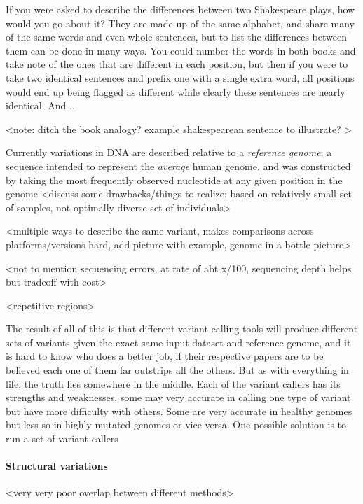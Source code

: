If you were asked to describe the differences between two Shakespeare plays, how would you go about it? They are made up of the same alphabet, and share many of the same words and even whole sentences, but to list the differences between them can be done in many ways. You could number the words in both books and take note of the ones that are different in each position, but then if you were to take two identical sentences and prefix one with a single extra word, all positions would end up being flagged as different while clearly these sentences are nearly identical. And ..

<note: ditch the book analogy? example shakespearean sentence to illustrate? >



Currently variations in DNA are described relative to a \emph{reference genome}; a sequence intended to represent the \emph{average} human genome, and was constructed by taking the most frequently observed nucleotide at any given  position in the genome
<discuss some drawbacks/things to realize: based on relatively small set of samples, not optimally diverse set of individuals>

<multiple ways to describe the same variant, makes comparisons across platforms/versions hard, add picture with example, genome in a bottle picture>

<not to mention sequencing errors, at rate of abt x/100, sequencing depth helps but tradeoff with cost>

<repetitive regions>

The result of all of this is that different variant calling tools will produce different sets of variants given the exact same input dataset and reference genome, and it is hard to know who does a better job, if their respective papers are to be believed each one of them far outstrips all the others. But as with everything in life, the truth lies somewhere in the middle. Each of the variant callers has its strengths and weaknesses, some may very accurate in calling one type of variant but have  more difficulty with others. Some are very accurate in healthy genomes but less so in highly mutated genomes or vice versa. One possible solution is to run a set of variant callers

\paragraph{Structural variations}
<very very poor overlap between different methods>

